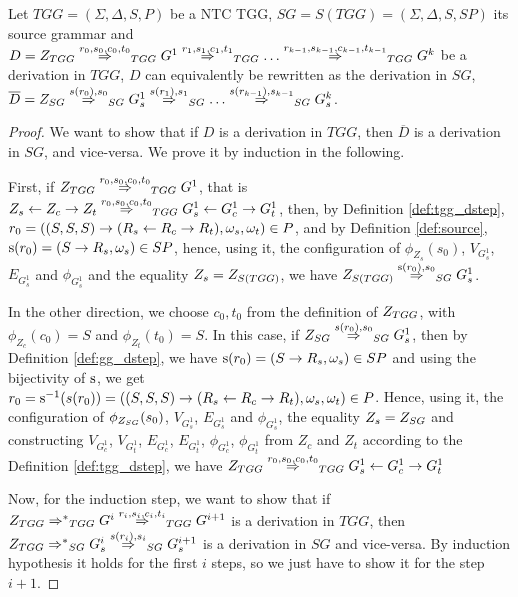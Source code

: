 \documentclass[runningheads]{llncs}
\begin{document}
\begin{theorem}
	\label{thm:one_d_enough}
	Let $TGG = (\Sigma, \Delta, S, P)$ be a NTC TGG, $SG = S(TGG) = (\Sigma, \Delta, S, SP)$ its source grammar and $D = \startTG{TGG} \tderiv{r_0}{s_0,c_0,t_0}{TGG} G^1 \tderiv{r_1}{s_1,c_1,t_1}{TGG} \dots \tderiv{r_{k-1}}{s_{k-1},c_{k-1},t_{k-1}}{TGG} G^k$ be a derivation in $TGG$, $D$ can equivalently be rewritten as the derivation in $SG$, $\overline{D} = \startG{SG} \deriv{s(r_0)}{s_0}{SG} G^1_s \deriv{s(r_1)}{s_1}{SG} \dots \deriv{s(r_{k-1})}{s_{k-1}}{SG} G^k_s $.
\end{theorem}
\begin{proof}
	We want to show that if $D$ is a derivation in $TGG$, then $\overline{D}$ is a derivation in $SG$, and vice-versa. We prove it by induction in the following.
	
	First, if $\startTG{TGG} \tderiv{r_0}{s_0,c_0,t_0}{TGG} G^1$, that is $Z_s \ms{} Z_c \mt{} Z_t \tderiv{r_0}{s_0,c_0,t_0}{TGG} G^1_s \ms{} G^1_c \mt{} G^1_t$, then, by Definition \ref{def:tgg_dstep}, $r_0 = ((S,S,S) \to (R_s \overset{}{\leftarrow} R_c \overset{}{\rightarrow} R_t), \omega_s, \omega_t) \in P$, and by Definition \ref{def:source}, $\operatorname{s}(r_0) = (S \to R_s, \omega_s) \in SP$, hence, using it, the configuration of $\phi_{Z_s}(s_0)$, $V_{G^1_s}$, $E_{G^1_s}$ and $\phi_{G^1_s}$ and the equality $Z_s = Z_{S(TGG)}$, we have $\startG{S(TGG)} \deriv{\source(r_0)}{s_0}{SG} G^1_s$.
	
	In the other direction, we choose $c_0, t_0$ from the definition of $Z_{TGG}$, with $\phi_{Z_c}(c_0) = S$ and  $\phi_{Z_t}(t_0) = S$. In this case, if $\startG{SG} \deriv{s(r_0)}{s_0}{SG} G^1_s$, then by Definition \ref{def:gg_dstep}, we have $\operatorname{s}(r_0) = (S \to R_s, \omega_s) \in SP$ and using the bijectivity of $\operatorname{s}$, we get $r_0 = \operatorname{s}^{-1}(s(r_0)) = ((S,S,S) \to (R_s \overset{}{\leftarrow} R_c \overset{}{\rightarrow} R_t), \omega_s, \omega_t) \in P$. Hence, using it, the configuration of $\phi_{Z_{SG}}(s_0)$, $V_{G^1_s}$, $E_{G^1_s}$ and $\phi_{G^1_s}$, the equality $Z_s = Z_{SG}$ and constructing $V_{G^1_c}$, $V_{G^1_t}$, $E_{G^1_c}$, $E_{G^1_t}$, $\phi_{G^1_c}$, $\phi_{G^1_t}$ from $Z_c$ and $Z_t$ according to the Definition \ref{def:tgg_dstep}, we have $\startTG{TGG} \tderiv{r_0}{s_0,c_0,t_0}{TGG} G^1_s \ms{} G^1_c \mt{} G^1_t$
	
	Now, for the induction step, we want to show that if $\startTG{TGG} \tderivtr{}{}{TGG} G^i \tderiv{r_{i}}{s_{i},c_{i},t_{i}}{TGG} G^{i+1}$ is a derivation in $TGG$, then $\startG{TGG} \derivtr{}{}{SG} G^i_s \deriv{s(r_{i})}{s_{i}}{SG} G^{i+1}_s$ is a derivation in $SG$ and vice-versa. By induction hypothesis it holds for the first $i$ steps, so we just have to show it for the step $i+1$.
	

\end{proof}
\end{document}
